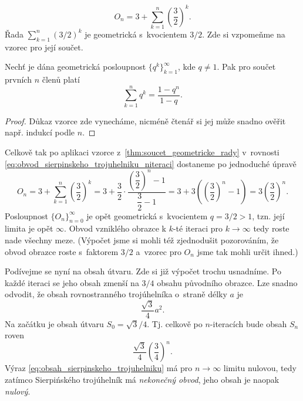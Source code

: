 \begin{equation}\label{eq:obvod_sierpinskeho_trojuhelniku_niteraci}
    O_n=3+\sum_{k=1}^n{\left(\dfrac{3}{2}\right)^k}.
\end{equation}
Řada $\sum_{k=1}^{n}(3/2)^k$ je geometrická s~kvocientem $3/2$. Zde si vzpomeňme na vzorec pro její součet.
\begin{theorem}\label{thm:soucet_geometricke_rady}
    Nechť je dána geometrická posloupnost $\{q^k\}_{k=1}^\infty$, kde $q\neq 1$. Pak pro součet prvních $n$ členů platí
    \begin{equation*}
        \sum_{k=1}^{n}{q^k}=\dfrac{1-q^n}{1-q}.
    \end{equation*}
\end{theorem}
\begin{proof}
    Důkaz vzorce zde vynecháme, nicméně čtenář si jej může snadno ověřit např. indukcí podle $n$. 
\end{proof}
Celkově tak po aplikaci vzorce z~\ref{thm:soucet_geometricke_rady} v~rovnosti \eqref{eq:obvod_sierpinskeho_trojuhelniku_niteraci} dostaneme po jednoduché úpravě
\begin{equation*}
    O_n=3+\sum_{k=1}^n{\left(\dfrac{3}{2}\right)^k}=3+\dfrac{3}{2}\cdot\dfrac{\left(\dfrac{3}{2}\right)^n-1}{\dfrac{3}{2}-1}=3+3\left(\left(\dfrac{3}{2}\right)^n-1\right)=3\left(\dfrac{3}{2}\right)^n.
\end{equation*}
Posloupnost $\{O_n\}_{n=0}^\infty$ je opět geometrická s~kvocientem $q=3/2>1$, tzn. její limita je opět $\infty$. Obvod vzniklého obrazce k $k$-té iteraci pro $k\to\infty$ tedy roste nade všechny meze. (Výpočet jsme si mohli též zjednodušit pozorováním, že obvod obrazce roste s~faktorem $3/2$ a~vzorec pro $O_n$ jsme tak mohli určit ihned.)\par
Podívejme se nyní na obsah útvaru. Zde si již výpočet trochu usnadníme. Po každé iteraci se jeho obsah zmenší na $3/4$ obsahu původního obrazce. Lze snadno odvodit, že obsah rovnostranného trojúhelníka o~straně délky $a$ je
\begin{equation*}
    \dfrac{\sqrt{3}}{4}a^2.
\end{equation*}
Na začátku je obsah útvaru $S_0=\sqrt{3}/4$. Tj. celkově po $n$-iteracích bude obsah $S_n$ roven
\begin{equation}\label{eq:obsah_sierpinskeho_trojuhelniku}
    \dfrac{\sqrt{3}}{4}\left(\dfrac{3}{4}\right)^n.
\end{equation}
Výraz \eqref{eq:obsah_sierpinskeho_trojuhelniku} má pro $n\to\infty$ limitu nulovou, tedy zatímco Sierpińského trojúhelník má \emph{nekonečný obvod}, jeho obsah je naopak \emph{nulový}.

